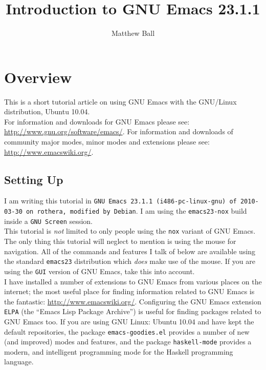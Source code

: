 \documentclass[12pt,a4paper,oneside]{article}
\title{Introduction to GNU Emacs 23.1.1}
\author{Matthew Ball}
\date{}
\begin{document}
\maketitle\newpage
\tableofcontents\newpage

\section{Overview}
This is a short tutorial article on using GNU Emacs with the GNU/Linux distribution, Ubuntu 10.04.\\

For information and downloads for GNU Emacs please see: \url{http://www.gnu.org/software/emacs/}. For information and downloads of community major modes, minor modes and extensions please see: \url{http://www.emacswiki.org/}.

\subsection{Setting Up}
I am writing this tutorial in \texttt{GNU Emacs 23.1.1 (i486-pc-linux-gnu) of 2010-03-30 on rothera, modified by Debian}. I am using the \texttt{emacs23-nox} build inside a \texttt{GNU Screen} session.\\

This tutorial is \emph{not} limited to only people using the \texttt{nox} variant of GNU Emacs.  The only thing this tutorial will neglect to mention is using the mouse for navigation.  All of the commands and features I talk of below are available using the standard \texttt{emacs23} distribution which \emph{does} make use of the mouse.  If you are using the \texttt{GUI} version of GNU Emacs, take this into account.\\

I have installed a number of extensions to GNU Emacs from various places on the internet; the most useful place for finding information related to GNU Emacs is the fantastic: \url{http://www.emacswiki.org/}. Configuring the GNU Emacs extension \texttt{ELPA} (the ``Emacs Lisp Package Archive'') is useful for finding packages related to GNU Emacs too. If you are using GNU Linux: Ubuntu 10.04 and have kept the default repositories, the package \texttt{emacs-goodies.el} provides a number of new (and improved) modes and features, and the package \texttt{haskell-mode} provides a modern, and intelligent programming mode for the Haskell programming language.
\end{document}
